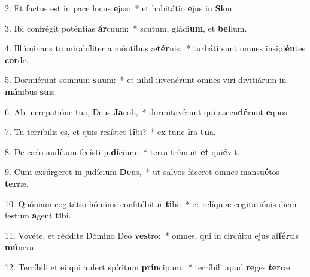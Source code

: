 2. Et factus est in pace locus \textbf{e}jus:~*  et habitátio \textbf{e}jus in \textbf{Si}on.\

3. Ibi confrégit poténtias \textbf{ár}cuum:~*  scutum, gládi\textbf{um}, et \textbf{bel}lum.\

4. Illúminans tu mirabíliter a móntibus æ\textbf{tér}nis:~*  turbáti sunt omnes insipi\textbf{én}tes \textbf{cor}de.\

5. Dormiérunt somnum \textbf{su}um:~*  et nihil invenérunt omnes viri divitiárum in \textbf{má}nibus \textbf{su}is.\

6. Ab increpatióne tua, Deus \textbf{Ja}cob,~*  dormitavérunt qui ascen\textbf{dé}runt \textbf{e}quos.\

7. Tu terríbilis es, et quis resístet \textbf{ti}bi?~*  ex tunc \textbf{i}ra \textbf{tu}a.\

8. De cælo audítum fecísti ju\textbf{dí}cium:~*  terra trémuit \textbf{et} qui\textbf{é}vit.\

9. Cum exsúrgeret in judícium \textbf{De}us,~*  ut salvos fáceret omnes mansu\textbf{é}tos \textbf{ter}ræ.\

10. Quóniam cogitátio hóminis confitébitur \textbf{ti}bi:~*  et relíquiæ cogitatiónis diem festum \textbf{a}gent \textbf{ti}bi.\

11. Vovéte, et réddite Dómino Deo \textbf{ves}tro:~*  omnes, qui in circúitu ejus af\textbf{fér}tis \textbf{mú}nera.\

12. Terríbili et ei qui aufert spíritum \textbf{prín}cipum,~*  terríbili apud \textbf{re}ges \textbf{ter}ræ.\

